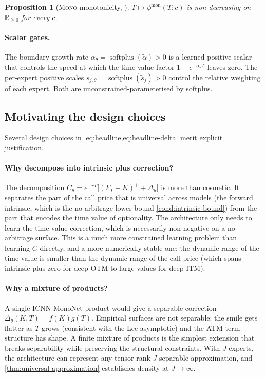 \documentclass[largeformat]{interact}
\let\cite\citep   %
\theoremstyle{plain}
\newtheorem{proposition}[theorem]{Proposition}
\theoremstyle{definition}
\newcommand{\R}{\mathbb{R}}
\DeclareMathOperator{\softplus}{softplus}
\newcommand{\mononet}{\textsc{Mono}}
\begin{document}
\begin{proposition}[\mononet{} monotonicity, {\cite{daniels2010monotone}}]
\label{prop:mono-monotonicity}
$T \mapsto \phi^{\mathrm{mon}}(T; c)$ is non-decreasing on $\R_{\geq 0}$ for every $c$.
\end{proposition}

\paragraph{Scalar gates.}
The boundary growth rate $\alpha_\theta = \softplus(\widetilde\alpha) > 0$ is a learned positive scalar that controls the speed at which the time-value factor $1 - e^{-\alpha_\theta T}$ leaves zero. The per-expert positive scales $s_{j,\theta} = \softplus(\widetilde s_j) > 0$ control the relative weighting of each expert. Both are unconstrained-parameterised by softplus.

\subsection{Motivating the design choices}
\label{sec:design-choices}

Several design choices in \cref{eq:headline,eq:headline-delta} merit explicit justification.

\paragraph{Why decompose into intrinsic plus correction?}
The decomposition $C_\theta = e^{-rT}\bigl[(F_T - K)^+ + \Delta_\theta\bigr]$ is more than cosmetic. It separates the part of the call price that is universal across models (the forward intrinsic, which is the no-arbitrage lower bound \ref{cond:intrinsic-bound}) from the part that encodes the time value of optionality. The architecture only needs to learn the time-value correction, which is necessarily non-negative on a no-arbitrage surface. This is a much more constrained learning problem than learning $C$ directly, and a more numerically stable one: the dynamic range of the time value is smaller than the dynamic range of the call price (which spans intrinsic plus zero for deep OTM to large values for deep ITM).

\paragraph{Why a mixture of products?}
A single ICNN-MonoNet product would give a separable correction $\Delta_\theta(K, T) = f(K) g(T)$. Empirical surfaces are not separable: the smile gets flatter as $T$ grows (consistent with the Lee asymptotic) and the ATM term structure has shape. A finite mixture of products is the simplest extension that breaks separability while preserving the structural constraints. With $J$ experts, the architecture can represent any tensor-rank-$J$ separable approximation, and \cref{thm:universal-approximation} establishes density at $J \to \infty$.
\end{document}
